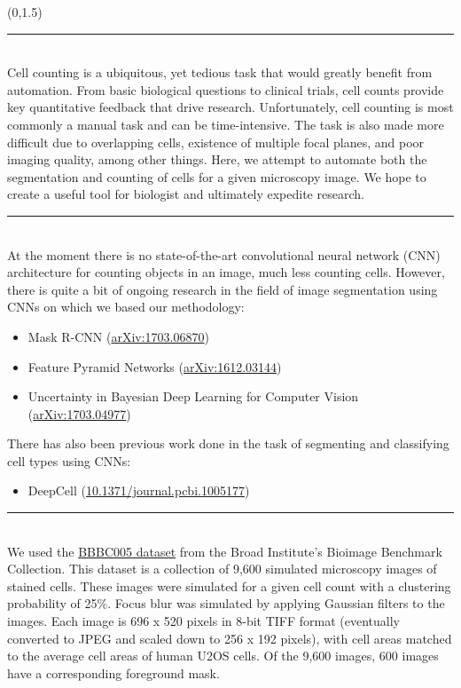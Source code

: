 \documentclass[a0]{a0poster}
\def\Head#1{\noindent{\LARGE\color{bluegray} #1}\bigskip}
\begin{document}
\begin{textblock}{7.0}(0,1.5)

\hrule\medskip
\Head{Motivation}\\
Cell counting is a ubiquitous, yet tedious task that would greatly benefit from automation.
From basic biological questions to clinical trials, cell counts provide key quantitative
feedback that drive research. Unfortunately, cell counting is most commonly a manual task
and can be time-intensive. The task is also made more difficult due to overlapping cells,
existence of multiple focal planes, and poor imaging quality, among other things.
Here, we attempt to automate both the segmentation and counting of cells for a given
microscopy image. We hope to create a useful tool for biologist and ultimately expedite research.

\medskip
\hrule\medskip
\Head{Previous Work}\\
At the moment there is no state-of-the-art convolutional neural network (CNN) architecture for
counting objects in an image, much less counting cells. However, there is quite a bit of ongoing
research in the field of image segmentation using CNNs on which we based our methodology:

\begin{itemize}\itemsep=12pt
\item Mask R-CNN (\href{https://arxiv.org/abs/1703.06870}{arXiv:1703.06870})
\item Feature Pyramid Networks (\href{https://arxiv.org/abs/1612.03144}{arXiv:1612.03144})
\item Uncertainty in Bayesian Deep Learning for Computer Vision (\href{https://arxiv.org/abs/1703.04977}{arXiv:1703.04977})
\end{itemize}

There has also been previous work done in the task of segmenting and classifying cell types using CNNs:

\begin{itemize}\itemsep=12pt
\item DeepCell (\href{https://doi.org/10.1371/journal.pcbi.1005177}{10.1371/journal.pcbi.1005177})
\end{itemize}

\medskip
\hrule\medskip
\Head{Dataset}\\
We used the \href{https://data.broadinstitute.org/bbbc/BBBC005/}{BBBC005 dataset} from the
Broad Institute's Bioimage Benchmark Collection. This dataset is a collection of 9,600 simulated microscopy
images of stained cells. These images were simulated for a given cell count with a clustering probability
of 25\%. Focus blur was simulated by applying Gaussian filters to the images. Each image is 696 x 520
pixels in 8-bit TIFF format (eventually converted to JPEG and scaled down to 256 x 192 pixels),
with cell areas matched to the average cell areas of human U2OS cells.
Of the 9,600 images, 600 images have a corresponding foreground mask.



\end{textblock}
\end{document}
